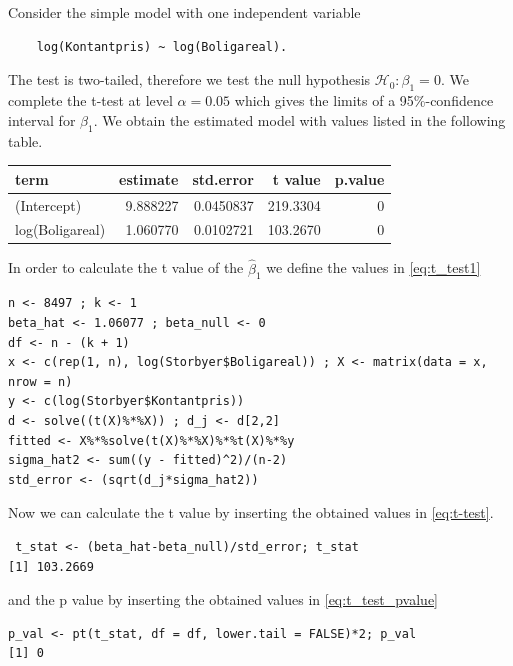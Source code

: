 \begin{example}  \label{ex:ttest}
Consider the simple model with one independent variable 
\begin{lstlisting}
    log(Kontantpris) ~ log(Boligareal). 
\end{lstlisting}
The test is two-tailed, therefore we test the null hypothesis $\mathcal{H}_0:\beta_1=0.$
We complete the t-test at level $\alpha=0.05$ which gives the limits of a 95\%-confidence interval for $\hat{\beta}_1$.
We obtain the estimated model with values listed in the following table.

\begin{table}[H]
\centering
\begin{tabular}{lrrrr}
\toprule
\textbf{term} & \textbf{estimate} & \textbf{std.error} & \textbf{t value} & \textbf{p.value}\\
\midrule
(Intercept) & 9.888227 & 0.0450837 & 219.3304 & 0\\
log(Boligareal) & 1.060770 & 0.0102721 & 103.2670 & 0\\
\bottomrule
\end{tabular}
\end{table}

In order to calculate the t value of the $\hat{\beta}_1$ we define the values in \eqref{eq:t_test1}
\begin{lstlisting}
n <- 8497 ; k <- 1
beta_hat <- 1.06077 ; beta_null <- 0
df <- n - (k + 1)
x <- c(rep(1, n), log(Storbyer$Boligareal)) ; X <- matrix(data = x, nrow = n)
y <- c(log(Storbyer$Kontantpris))
d <- solve((t(X)%*%X)) ; d_j <- d[2,2]
fitted <- X%*%solve(t(X)%*%X)%*%t(X)%*%y
sigma_hat2 <- sum((y - fitted)^2)/(n-2)
std_error <- (sqrt(d_j*sigma_hat2))
\end{lstlisting}
Now we can calculate the t value by inserting the obtained values in \eqref{eq:t-test}.
\begin{lstlisting}
 t_stat <- (beta_hat-beta_null)/std_error; t_stat
[1] 103.2669
\end{lstlisting}
and the p value by inserting the obtained values in \eqref{eq:t_test_pvalue}
\begin{lstlisting}
p_val <- pt(t_stat, df = df, lower.tail = FALSE)*2; p_val
[1] 0
\end{lstlisting}


\end{example}

